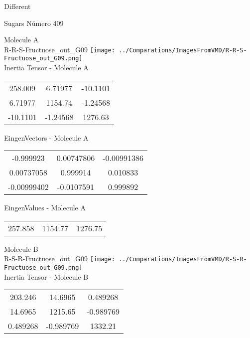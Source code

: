 \begin{center}
\vtab
\vtab
\textcolor{NavyBlue}{\Large Different}
\end{center}

 \newpage

\vtab[-2cm]
\begin{center}
{\large Sugars \tab Número 409}
\end{center}
\begin{multicols}{2}
\begin{center}

Molecule A \\ 
R-R-S-Fructuose\_out\_G09
\texttt{[image: ../Comparations/ImagesFromVMD/R-R-S-Fructuose\_out\_G09.png]}
\\
Inertia Tensor - Molecule A \\
\vtab

\begin{tabular}{|c c c|}
258.009	 & 	6.71977	 & 	-10.1101	 \\
6.71977	 & 	1154.74	 & 	-1.24568	 \\
-10.1101	 & 	-1.24568	 & 	1276.63
\end{tabular}

\vtab
 EingenVectors - Molecule A     \\
\vtab
\begin{tabular}{|c c c|}
-0.999923	 & 	0.00747806	 & 	-0.00991386	 \\
0.00737058	 & 	0.999914	 & 	0.010833	 \\
-0.00999402	 & 	-0.0107591	 & 	0.999892
\end{tabular}

\vtab
 EingenValues - Molecule A     \\
\vtab
\begin{tabular}{|c c c|}
257.858	 & 	1154.77	 & 	1276.75	 \\
\end{tabular}
\columnbreak

Molecule B \\ 
R-S-R-Fructuose\_out\_G09
\texttt{[image: ../Comparations/ImagesFromVMD/R-S-R-Fructuose\_out\_G09.png]}
\\
Inertia Tensor - Molecule B \\
\vtab

\begin{tabular}{|c c c|}
203.246	 & 	14.6965	 & 	0.489268	 \\
14.6965	 & 	1215.65	 & 	-0.989769	 \\
0.489268	 & 	-0.989769	 & 	1332.21
\end{tabular}


\end{center}
\end{multicols}
